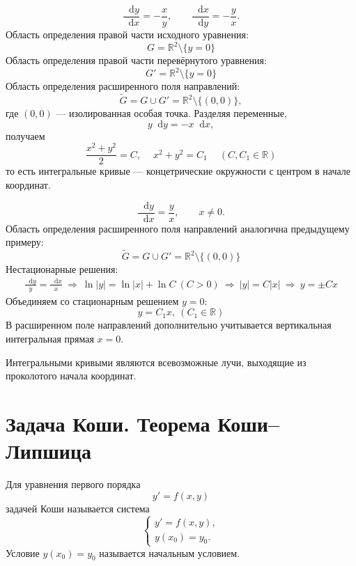 \documentclass[12pt,a4paper]{article}
\numberwithin{equation}{section}
\newcommand{\R}{\mathbb{R}}
\newcommand{\dd}{\mathop{}\!\mathrm{d}}
\begin{document}
\begin{exampleHSE}[Уравнение $y'=-x/y$]
\[
\frac{\dd y}{\dd x}=-\frac{x}{y},\qquad
\frac{\dd x}{\dd y}=-\frac{y}{x}.
\]
Область определения правой части исходного уравнения:
\[G=\mathbb{R}^2\setminus\{y=0\}\]
Область определения правой части перевёрнутого уравнения:
\[G'=\mathbb{R}^2\setminus\{y=0\}\]
Область определения расширенного поля направлений:
\[
\widetilde G=G\cup G'=\R^2\setminus\{(0,0)\},
\]
где $(0,0)$ --- изолированная особая точка. Разделяя переменные,
\[
y\dd y=-x\dd x,
\]
получаем
\[
\frac{x^2+y^2}{2}=C,\quad\boxed{\ x^2+y^2=C_1\ }\quad
(C,C_1\in\R)
\]
то есть интегральные кривые --- концетрические окружности с центром в начале координат.

\end{exampleHSE}

\begin{exampleHSE}[Уравнение $y'=y/x$ (дикритический узел)]
\[
\frac{\dd y}{\dd x}=\frac{y}{x},\qquad x\neq0.
\]
Область определения расширенного поля направлений аналогична предыдущему примеру:
\[
\widetilde G=G\cup G'=\R^2\setminus\{(0,0)\}
\]
Нестационарные решения:
\begin{gather*}
\frac{\dd y}{y}=\frac{\dd x}{x}
\ \Longrightarrow\ 
\ln|y|=\ln|x|+\ln C\ (C>0)
\ \Longrightarrow\ |y|=C|x|\ \Longrightarrow\ y=\pm Cx
\end{gather*}
Объединяем со стационарным решением \(y=0\):
\[y=C_1 x,\ (C_1\in\R)\]
В расширенном поле направлений дополнительно учитывается вертикальная интегральная прямая $x=0$.

Интегральными кривыми являются всевозможные лучи, выходящие из проколотого начала координат.

\end{exampleHSE}

\section{Задача Коши. Теорема Коши--Липшица}

\begin{definitionHSE}
Для уравнения первого порядка
\[
y'=f(x,y)
\]
задачей Коши называется система
\begin{equation}
\begin{cases}
 y'=f(x,y),\\
 y(x_0)=y_0.
\end{cases}
\label{eq:cauchy}
\end{equation}
Условие $y(x_0)=y_0$ называется начальным условием.
\end{definitionHSE}
\end{document}
